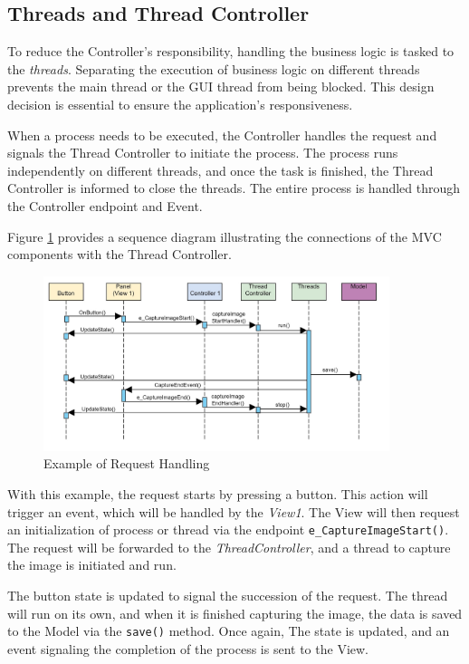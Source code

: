 \subsection{Threads and Thread Controller}
\label{subsec:thread_and_thread_controller}
To reduce the Controller's responsibility, handling the business logic is tasked to the \textit{threads}. Separating the execution of business logic on different threads prevents the main thread or the GUI thread from being blocked. This design decision is essential to ensure the application's responsiveness.

When a process needs to be executed, the Controller handles the request and signals the Thread Controller to initiate the process. The process runs independently on different threads, and once the task is finished, the Thread Controller is informed to close the threads. The entire process is handled through the Controller endpoint and Event.

Figure \ref{fig:sequence_diagram} provides a sequence diagram illustrating the connections of the MVC components with the Thread Controller.

\begin{figure}[!ht]
    \centering
    \includegraphics[width=0.9\textwidth]{texs/Part2/chapter4/image/sequence.jpg}
    \caption{Example of Request Handling}
    \label{fig:sequence_diagram}
\end{figure}

With this example, the request starts by pressing a button. This action will trigger an event, which will be handled by the \textit{View1}. The View will then request an initialization of process or thread via the endpoint \texttt{e\_CaptureImageStart()}. The request will be forwarded to the \textit{ThreadController}, and a thread to capture the image is initiated and run.

The button state is updated to signal the succession of the request. The thread will run on its own, and when it is finished capturing the image, the data is saved to the Model via the \texttt{save()} method. Once again, The state is updated, and an event signaling the completion of the process is sent to the View.

